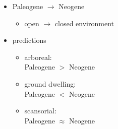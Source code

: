 \documentclass{beamer}
\begin{document}
\begin{frame}
\begin{columns}
\begin{column}{0.5\textwidth}
      \tiny{}
    \end{column}
    \begin{column}{0.5\textwidth}
      \begin{itemize}
        \item Paleogene \(\to\) Neogene
          \begin{itemize}
            \item open \(\to\) closed environment
          \end{itemize}
        \item predictions
          \begin{itemize}
            \item arboreal: \\Paleogene \(>\) Neogene
            \item ground dwelling: \\Paleogene \(<\) Neogene
            \item scansorial: \\Paleogene \(\approx\) Neogene
          \end{itemize}
      \end{itemize}
    \end{column}
  \end{columns}
\end{frame}
\end{document}
